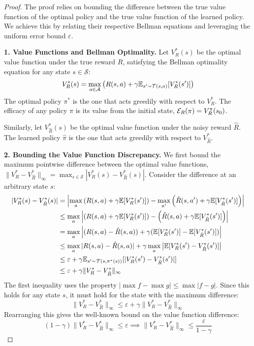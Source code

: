 \begin{proof}
The proof relies on bounding the difference between the true value function of the optimal policy and the true value function of the learned policy. We achieve this by relating their respective Bellman equations and leveraging the uniform error bound $\varepsilon$.

\noindent\textbf{1. Value Functions and Bellman Optimality.}
Let $V^*_R(s)$ be the optimal value function under the true reward $R$, satisfying the Bellman optimality equation for any state $s \in \mathcal{S}$:
\[ V^*_R(s) = \max_{a \in \mathcal{A}} \left( R(s,a) + \gamma \mathbb{E}_{s' \sim \mathcal{T}(s,a)}[V^*_R(s')] \right) \]
The optimal policy $\pi^*$ is the one that acts greedily with respect to $V^*_R$. The efficacy of any policy $\pi$ is its value from the initial state, $\mathcal{E}_R(\pi) = V^\pi_R(s_0)$.

Similarly, let $V^*_{\hat{R}}(s)$ be the optimal value function under the noisy reward $\hat{R}$. The learned policy $\hat{\pi}$ is the one that acts greedily with respect to $V^*_{\hat{R}}$.

\noindent\textbf{2. Bounding the Value Function Discrepancy.}
We first bound the maximum pointwise difference between the optimal value functions, $\|V^*_R - V^*_{\hat{R}}\|_{\infty} = \max_{s \in \mathcal{S}} |V^*_R(s) - V^*_{\hat{R}}(s)|$.
Consider the difference at an arbitrary state $s$:
\begin{align*}
|V^*_R(s) - V^*_{\hat{R}}(s)| &= \left| \max_a \left( R(s,a) + \gamma \mathbb{E}[V^*_R(s')] \right) - \max_{a'} \left( \hat{R}(s,a') + \gamma \mathbb{E}[V^*_{\hat{R}}(s')] \right) \right| \\
&\le \max_a \left| \left( R(s,a) + \gamma \mathbb{E}[V^*_R(s')] \right) - \left( \hat{R}(s,a) + \gamma \mathbb{E}[V^*_{\hat{R}}(s')] \right) \right| \\
&= \max_a \left| (R(s,a) - \hat{R}(s,a)) + \gamma (\mathbb{E}[V^*_R(s')] - \mathbb{E}[V^*_{\hat{R}}(s')]) \right| \\
&\le \max_a |R(s,a) - \hat{R}(s,a)| + \gamma \max_a \left| \mathbb{E}[V^*_R(s') - V^*_{\hat{R}}(s')] \right| \\
&\le \varepsilon + \gamma \mathbb{E}_{s' \sim \mathcal{T}(s, \pi^*(s))} [|V^*_R(s') - V^*_{\hat{R}}(s')|] \\
&\le \varepsilon + \gamma \|V^*_R - V^*_{\hat{R}}\|_{\infty}
\end{align*}
The first inequality uses the property $|\max f - \max g| \le \max |f - g|$. Since this holds for any state $s$, it must hold for the state with the maximum difference:
\[ \|V^*_R - V^*_{\hat{R}}\|_{\infty} \le \varepsilon + \gamma \|V^*_R - V^*_{\hat{R}}\|_{\infty} \]
Rearranging this gives the well-known bound on the value function difference:
\[ (1-\gamma)\|V^*_R - V^*_{\hat{R}}\|_{\infty} \le \varepsilon \implies \|V^*_R - V^*_{\hat{R}}\|_{\infty} \le \frac{\varepsilon}{1-\gamma} \]


\end{proof}

